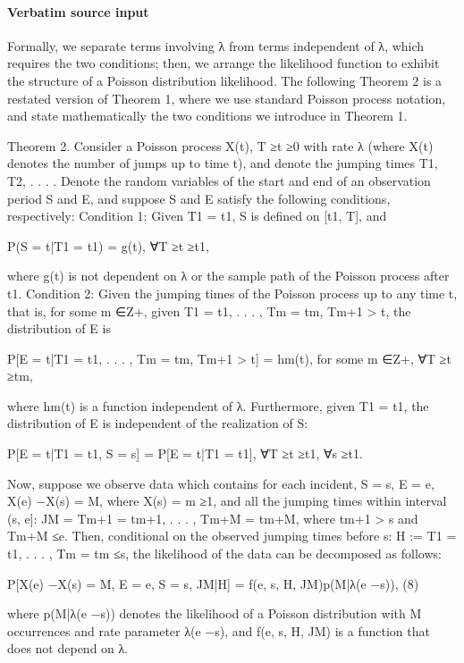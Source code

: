 \documentclass[10pt]{article}
\begin{document}
\paragraph{Verbatim source input}
\begin{ReviewVerbatim}
Formally, we separate terms involving λ from terms independent of λ, which requires the two
conditions; then, we arrange the likelihood function to exhibit the structure of a Poisson distribution
likelihood.
The following Theorem 2 is a restated version of Theorem 1, where we use standard Poisson
process notation, and state mathematically the two conditions we introduce in Theorem 1.

Theorem 2. Consider a Poisson process {X(t), T ≥t ≥0} with rate λ (where X(t) denotes the
number of jumps up to time t), and denote the jumping times {T1, T2, . . . }. Denote the random
variables of the start and end of an observation period S and E, and suppose S and E satisfy the
following conditions, respectively:
Condition 1: Given T1 = t1, S is defined on [t1, T], and

P(S = t|T1 = t1) = g(t), ∀T ≥t ≥t1,

where g(t) is not dependent on λ or the sample path of the Poisson process after t1.
Condition 2: Given the jumping times of the Poisson process up to any time t, that is, for some
m ∈Z+, given {T1 = t1, . . . , Tm = tm, Tm+1 > t}, the distribution of E is

P[E = t|{T1 = t1, . . . , Tm = tm, Tm+1 > t}] = hm(t), for some m ∈Z+, ∀T ≥t ≥tm,

where hm(t) is a function independent of λ. Furthermore, given T1 = t1, the distribution of E is
independent of the realization of S:

P[E = t|T1 = t1, S = s] = P[E = t|T1 = t1], ∀T ≥t ≥t1, ∀s ≥t1.

Now, suppose we observe data which contains for each incident, S = s, E = e, X(e) −X(s) =
M, where X(s) = m ≥1, and all the jumping times within interval (s, e]: JM = {Tm+1 =
tm+1, . . . , Tm+M = tm+M}, where tm+1 > s and Tm+M ≤e. Then, conditional on the observed
jumping times before s: H := {T1 = t1, . . . , Tm = tm ≤s}, the likelihood of the data can be
decomposed as follows:

P[X(e) −X(s) = M, E = e, S = s, JM|H] = f(e, s, H, JM)p(M|λ(e −s)),
(8)

where p(M|λ(e −s)) denotes the likelihood of a Poisson distribution with M occurrences and rate
parameter λ(e −s), and f(e, s, H, JM) is a function that does not depend on λ.
\end{ReviewVerbatim}
\end{document}
